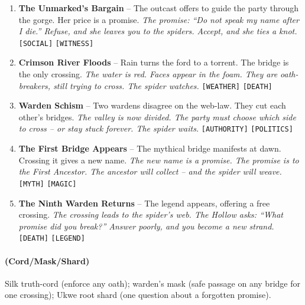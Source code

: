 \begin{enumerate}
\item \textbf{The Unmarked's Bargain} -- The outcast offers to guide the party through the gorge. Her price is a promise.
  \hfill \textit{The promise: ``Do not speak my name after I die.'' Refuse, and she leaves you to the spiders. Accept, and she ties a knot.} \texttt{[SOCIAL]} \texttt{[WITNESS]}
\item[\card{\clubsuit}{J}] \textbf{Crimson River Floods} -- Rain turns the ford to a torrent. The bridge is the only crossing.
  \hfill \textit{The water is red. Faces appear in the foam. They are oath-breakers, still trying to cross. The spider watches.} \texttt{[WEATHER]} \texttt{[DEATH]}
\item[\card{\clubsuit}{Q}] \textbf{Warden Schism} -- Two wardens disagree on the web-law. They cut each other's bridges.
  \hfill \textit{The valley is now divided. The party must choose which side to cross -- or stay stuck forever. The spider waits.} \texttt{[AUTHORITY]} \texttt{[POLITICS]}
\item[\card{\clubsuit}{K}] \textbf{The First Bridge Appears} -- The mythical bridge manifests at dawn. Crossing it gives a new name.
  \hfill \textit{The new name is a promise. The promise is to the First Ancestor. The ancestor will collect -- and the spider will weave.} \texttt{[MYTH]} \texttt{[MAGIC]}
\item[\card{\clubsuit}{A}] \textbf{The Ninth Warden Returns} -- The legend appears, offering a free crossing.
  \hfill \textit{The crossing leads to the spider's web. The Hollow asks: ``What promise did you break?'' Answer poorly, and you become a new strand.} \texttt{[DEATH]} \texttt{[LEGEND]}
\end{enumerate}

\paragraph*{(Cord/Mask/Shard)} Silk truth-cord (enforce any oath); warden's mask (safe passage on any bridge for one crossing); Ukwe root shard (one question about a forgotten promise).

